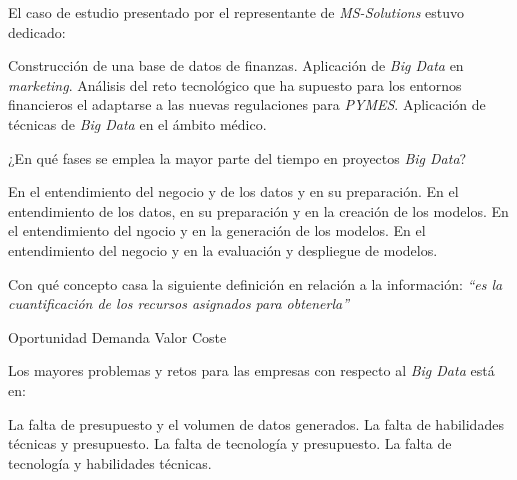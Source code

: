 \documentclass[a4paper]{exam}
\begin{document}
 \vspace{0.5cm}

 \vspace{1cm}

\begin{questions}

  \question El caso de estudio presentado por el representante de \emph{MS-Solutions} estuvo dedicado:

  \begin{choices}
    \choice Construcción de una base de datos de finanzas.
    \choice Aplicación de \emph{Big Data} en \emph{marketing}.
    \CorrectChoice Análisis del reto tecnológico que ha supuesto para los
    entornos financieros el adaptarse a las nuevas regulaciones para
    \emph{PYMES}.
    \choice Aplicación de técnicas de \emph{Big Data} en el ámbito médico.
  \end{choices}

  \question ¿En qué fases se emplea la mayor parte del tiempo en
  proyectos \emph{Big Data}?

  \begin{choices}
    \choice En el entendimiento del negocio y de los datos y en su
    preparación.
    \choice En el entendimiento de los datos, en su preparación y en
    la creación de los modelos.
    \choice En el entendimiento del ngocio y en la generación de los
    modelos.
    \choice En el entendimiento del negocio y en la evaluación y
    despliegue de modelos.
  \end{choices}

  \question Con qué concepto casa la siguiente definición en relación
  a la información: \emph{``es la cuantificación de los recursos asignados
      para obtenerla''}

  \begin{choices}
    \choice Oportunidad
    \choice Demanda
    \choice Valor
    \CorrectChoice Coste
  \end{choices}

  \question Los mayores problemas y retos para las empresas con
  respecto al \emph{Big Data} está en:

  \begin{choices}
    \choice La falta de presupuesto y el volumen de datos generados.
    \choice La falta de habilidades técnicas y presupuesto.
    \choice La falta de tecnología y presupuesto.
    \CorrectChoice La falta de tecnología y habilidades técnicas.
  \end{choices}


\end{questions}
\end{document}
